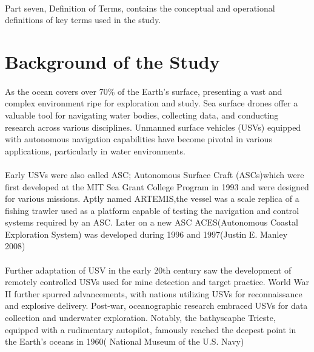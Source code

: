 \paragraph{} Part seven, Definition of Terms, contains the conceptual and operational definitions of key terms used in the study.

\section{Background of the Study}
\paragraph{} As the ocean covers over 70\% of the Earth's surface, presenting a vast and complex environment ripe for exploration and study. 
            Sea surface drones offer a valuable tool for navigating water bodies, collecting data, and conducting research across various disciplines. 
            Unmanned surface vehicles (USVs) equipped with autonomous navigation capabilities have become pivotal in various applications, particularly 
            in water environments.

\paragraph{} Early USVs were also called ASC; Autonomous Surface Craft (ASCs)which were first developed at the MIT Sea Grant College Program in 1993 and 
            were designed for various missions. Aptly named ARTEMIS,the vessel was a scale replica of a fishing trawler used as a platform capable of 
            testing the navigation and control systems required by an ASC. Later on a new ASC ACES(Autonomous Coastal Exploration System) was developed 
            during 1996 and 1997(Justin E. Manley 2008)

\paragraph{} Further adaptation of USV in the early 20th century saw the development of remotely controlled USVs used for mine detection and target 
            practice. World War II further spurred advancements, with nations utilizing USVs for reconnaissance and explosive delivery. Post-war, 
            oceanographic research embraced USVs for data collection and underwater exploration. Notably, the bathyscaphe Trieste, equipped with a 
            rudimentary autopilot, famously reached the deepest point in the Earth's oceans in 1960( National Museum of the U.S. Navy)
          

